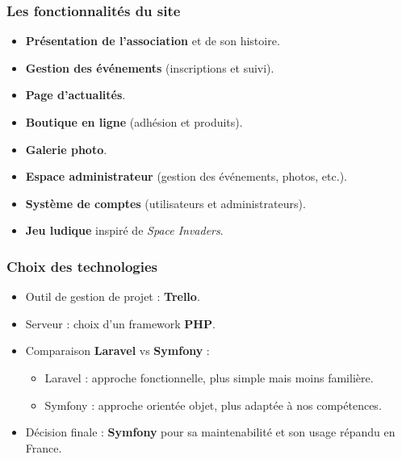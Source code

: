 \documentclass[pdf]{beamer}
\begin{document}
\begin{frame}
    \frametitle{Les fonctionnalités du site}

    \begin{itemize}
        \item \textbf{Présentation de l’association} et de son histoire.
        \item \textbf{Gestion des événements} (inscriptions et suivi).
        \item \textbf{Page d’actualités}.
        \item \textbf{Boutique en ligne} (adhésion et produits).
        \item \textbf{Galerie photo}.
        \item \textbf{Espace administrateur} (gestion des événements, photos, etc.).
        \item \textbf{Système de comptes} (utilisateurs et administrateurs).
        \item \textbf{Jeu ludique} inspiré de \textit{Space Invaders}.
    \end{itemize}
\end{frame}

\begin{frame}
    \frametitle{Choix des technologies}

    \begin{itemize}
        \item Outil de gestion de projet : \textbf{Trello}.
        \item Serveur : choix d’un framework \textbf{PHP}.
        \item Comparaison \textbf{Laravel} vs \textbf{Symfony} :
              \begin{itemize}
                \item Laravel : approche fonctionnelle, plus simple mais moins familière.
                \item Symfony : approche orientée objet, plus adaptée à nos compétences.
              \end{itemize}
        \item Décision finale : \textbf{Symfony} pour sa maintenabilité et son usage répandu en France.
    \end{itemize}
\end{frame}
\end{document}
